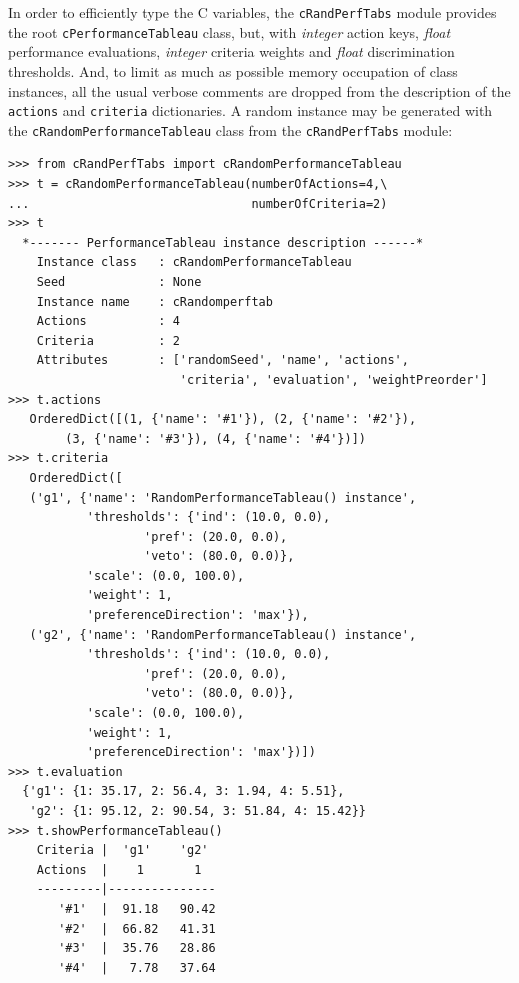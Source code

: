 In order to efficiently type the C variables, the \texttt{cRandPerfTabs} module provides the root \texttt{cPerformanceTableau} class, but, with \emph{integer} action keys, \emph{float} performance evaluations, \emph{integer} criteria weights and \emph{float} discrimination thresholds. And, to limit as much as possible memory occupation of class instances, all the usual verbose comments are dropped from the description of the \texttt{actions} and \texttt{criteria} dictionaries. A random instance may be generated with the  \texttt{cRandomPerformanceTableau} class from the \texttt{cRandPerfTabs} module:
\begin{lstlisting}[caption={Big data performance tableau format},label=list:11.1,basicstyle=\ttfamily\scriptsize]
>>> from cRandPerfTabs import cRandomPerformanceTableau
>>> t = cRandomPerformanceTableau(numberOfActions=4,\
...                               numberOfCriteria=2)
>>> t
  *------- PerformanceTableau instance description ------*
    Instance class   : cRandomPerformanceTableau
    Seed             : None
    Instance name    : cRandomperftab
    Actions          : 4
    Criteria         : 2
    Attributes       : ['randomSeed', 'name', 'actions',
                        'criteria', 'evaluation', 'weightPreorder']
>>> t.actions
   OrderedDict([(1, {'name': '#1'}), (2, {'name': '#2'}),
		(3, {'name': '#3'}), (4, {'name': '#4'})])
>>> t.criteria
   OrderedDict([
   ('g1', {'name': 'RandomPerformanceTableau() instance',
	       'thresholds': {'ind': (10.0, 0.0),
			       'pref': (20.0, 0.0),
			       'veto': (80.0, 0.0)},
	       'scale': (0.0, 100.0),
	       'weight': 1,
	       'preferenceDirection': 'max'}),
   ('g2', {'name': 'RandomPerformanceTableau() instance',
	       'thresholds': {'ind': (10.0, 0.0),
			       'pref': (20.0, 0.0),
			       'veto': (80.0, 0.0)},
	       'scale': (0.0, 100.0),
	       'weight': 1,
	       'preferenceDirection': 'max'})])
>>> t.evaluation
  {'g1': {1: 35.17, 2: 56.4, 3: 1.94, 4: 5.51},
   'g2': {1: 95.12, 2: 90.54, 3: 51.84, 4: 15.42}}
>>> t.showPerformanceTableau()
	Criteria |  'g1'    'g2'   
	Actions  |    1       1    
	---------|---------------
	   '#1'  |  91.18   90.42  
	   '#2'  |  66.82   41.31  
	   '#3'  |  35.76   28.86  
	   '#4'  |   7.78   37.64  
\end{lstlisting}

